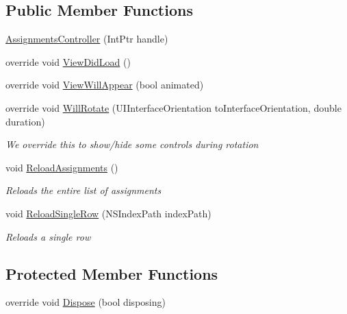 \subsection*{Public Member Functions}
\begin{DoxyCompactItemize}
\item 
\hyperlink{class_field_service_1_1i_o_s_1_1_assignments_controller_ab98aafcdc483da66191f348f406946a5}{Assignments\+Controller} (Int\+Ptr handle)
\item 
override void \hyperlink{class_field_service_1_1i_o_s_1_1_assignments_controller_a26136a1dcac6bba335728b28bc22c846}{View\+Did\+Load} ()
\item 
override void \hyperlink{class_field_service_1_1i_o_s_1_1_assignments_controller_a82728bc06ed3b4d37cb847e1d92802be}{View\+Will\+Appear} (bool animated)
\item 
override void \hyperlink{class_field_service_1_1i_o_s_1_1_assignments_controller_aaeb441dfe8149a4268002672055ed6c5}{Will\+Rotate} (U\+I\+Interface\+Orientation to\+Interface\+Orientation, double duration)
\begin{DoxyCompactList}\small\item\em We override this to show/hide some controls during rotation \end{DoxyCompactList}\item 
void \hyperlink{class_field_service_1_1i_o_s_1_1_assignments_controller_aff9d9539cb4fa3e3a2842e25c81300a2}{Reload\+Assignments} ()
\begin{DoxyCompactList}\small\item\em Reloads the entire list of assignments \end{DoxyCompactList}\item 
void \hyperlink{class_field_service_1_1i_o_s_1_1_assignments_controller_a6d8cb4c8efc0cdb2473d78fec73728ae}{Reload\+Single\+Row} (N\+S\+Index\+Path index\+Path)
\begin{DoxyCompactList}\small\item\em Reloads a single row \end{DoxyCompactList}\end{DoxyCompactItemize}
\subsection*{Protected Member Functions}
\begin{DoxyCompactItemize}
\item 
override void \hyperlink{class_field_service_1_1i_o_s_1_1_assignments_controller_a30ab7422236b2abda561debd32b2ae66}{Dispose} (bool disposing)
\end{DoxyCompactItemize}
